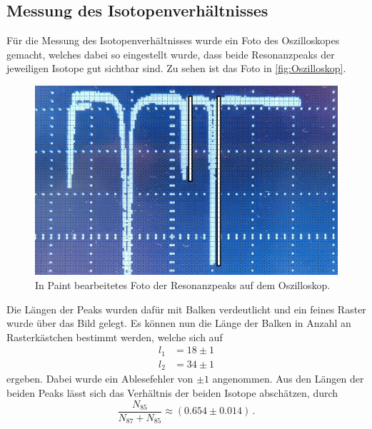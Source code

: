 \subsection{Messung des Isotopenverhältnisses}
Für die Messung des Isotopenverhältnisses wurde ein Foto des Oszilloskopes gemacht, welches dabei so eingestellt wurde, dass beide Resonanzpeaks der jeweiligen Isotope gut sichtbar sind.
Zu sehen ist das Foto in \autoref{fig:Oszilloskop}.
\begin{figure}[H]
  \centering
  \includegraphics[width=0.6\linewidth]{build/peaks_len.pdf}
  \caption{In Paint bearbeitetes Foto der Resonanzpeaks auf dem Oszilloskop. \cite{ms_paint}}
  \label{fig:Oszilloskop}
\end{figure}
\noindent
Die Längen der Peaks wurden dafür mit Balken verdeutlicht und ein feines Raster wurde über das Bild gelegt. Es können nun die Länge der Balken in Anzahl an Rasterkästchen bestimmt werden, welche sich auf
\begin{align*}
  l_{1} &=  18 \pm 1 \\
  l_{2} &=  34 \pm 1
\end{align*}
ergeben. Dabei wurde ein Ablesefehler von $\pm 1$ angenommen. Aus den Längen der beiden Peaks lässt sich das Verhältnis der beiden Isotope abschätzen, durch
\begin{equation}
  \frac{N_{85}}{N_{87} + N_{85}} \approx \left( 0.654 \pm 0.014 \right) \, .
\end{equation}

